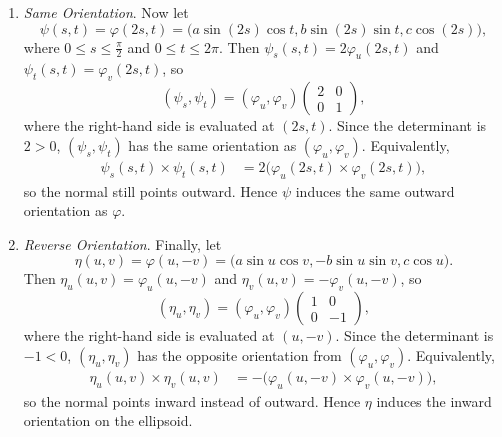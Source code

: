 \begin{example}
\begin{enumerate}
			\item \textit{Same Orientation}. Now let
				\begin{equation}
					\psi(s,t) = \varphi(2s,t) = \big( a\sin(2s)\cos t, b\sin(2s)\sin t, c\cos(2s) \big),
				\end{equation}
				where $0 \leq s \leq \tfrac{\pi}{2}$ and $0 \leq t \leq 2\pi$. Then $\psi_s(s,t)=2\varphi_u(2s,t)$ and $\psi_t(s,t)=\varphi_v(2s,t)$, so
				\begin{equation}
					(\psi_s,\psi_t)
					=
					(\varphi_u,\varphi_v)
					\begin{pmatrix}
					2 & 0 \\
					0 & 1
					\end{pmatrix},
				\end{equation}
				where the right-hand side is evaluated at $(2s,t)$. Since the determinant is $2>0$, $(\psi_s,\psi_t)$ has the same orientation as $(\varphi_u,\varphi_v)$. Equivalently,
				\begin{align}
					\psi_s(s,t) \times \psi_t(s,t)
					&=
					2\bigl(\varphi_u(2s,t) \times \varphi_v(2s,t)\bigr),
				\end{align}
				so the normal still points outward. Hence $\psi$ induces the same outward orientation as $\varphi$.

			\item \textit{Reverse Orientation}. Finally, let
				\begin{equation}
					\eta(u,v) = \varphi(u,-v) = \big( a\sin u \cos v, -b\sin u \sin v, c\cos u \big).
				\end{equation}
				Then $\eta_u(u,v)=\varphi_u(u,-v)$ and $\eta_v(u,v)=-\varphi_v(u,-v)$, so
				\begin{equation}
					(\eta_u,\eta_v)
					=
					(\varphi_u,\varphi_v)
					\begin{pmatrix}
					1 & 0 \\
					0 & -1
					\end{pmatrix},
				\end{equation}
				where the right-hand side is evaluated at $(u,-v)$. Since the determinant is $-1<0$, $(\eta_u,\eta_v)$ has the opposite orientation from $(\varphi_u,\varphi_v)$. Equivalently,
				\begin{align}
					\eta_u(u,v) \times \eta_v(u,v)
					&=
					-\bigl(\varphi_u(u,-v) \times \varphi_v(u,-v)\bigr),
				\end{align}
				so the normal points inward instead of outward. Hence $\eta$ induces the inward orientation on the ellipsoid.
		\end{enumerate}
	\end{example}

